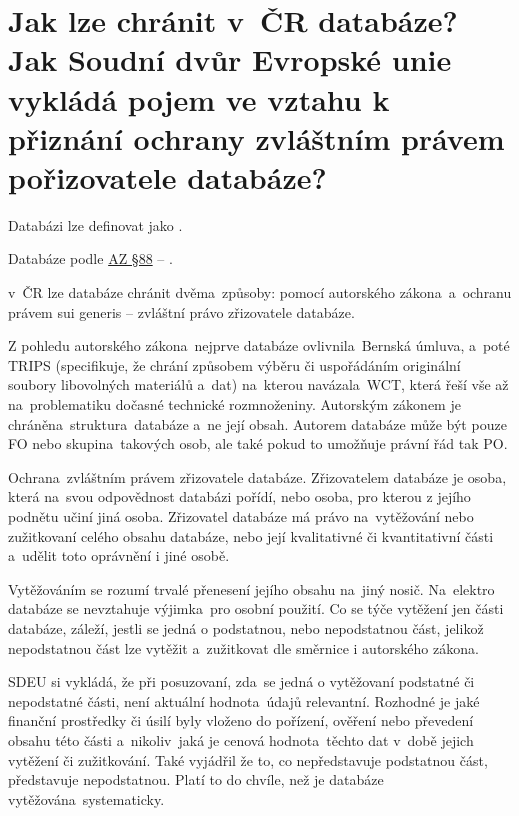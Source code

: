 \section{Jak lze chránit v~ČR databáze? Jak Soudní dvůr Evropské unie vykládá pojem  ve vztahu k přiznání ochrany zvláštním právem pořizovatele databáze?}

Databázi lze definovat jako .

Databáze podle \href{https://www.zakonyprolidi.cz/cs/2000-121#p88}{AZ §88} -- .

v~ČR lze databáze chránit dvěma~způsoby: pomocí autorského zákona~a~ochranu právem sui generis -- zvláštní právo zřizovatele databáze.

Z pohledu autorského zákona~nejprve databáze ovlivnila~Bernská úmluva, a~poté TRIPS (specifikuje, že chrání způsobem výběru či uspořádáním originální soubory libovolných materiálů a~dat) na~kterou navázala~WCT, která řeší vše až na~problematiku dočasné technické rozmnoženiny. Autorským zákonem je chráněna~struktura~databáze a~ne její obsah. Autorem databáze může být pouze FO nebo skupina~takových osob, ale také pokud to umožňuje právní řád tak PO\@.

Ochrana~zvláštním právem zřizovatele databáze. Zřizovatelem databáze je osoba, která na~svou odpovědnost databázi pořídí, nebo osoba, pro kterou z jejího podnětu učiní jiná osoba. Zřizovatel databáze má právo na~vytěžování nebo zužitkovaní celého obsahu databáze, nebo její kvalitativné či kvantitativní části a~udělit toto oprávnění i jiné osobě. 

Vytěžováním se rozumí trvalé přenesení jejího obsahu na~jiný nosič. Na~elektro databáze se nevztahuje výjimka~pro osobní použití. Co se týče vytěžení jen části databáze, záleží, jestli se jedná o podstatnou, nebo nepodstatnou část, jelikož nepodstatnou část lze vytěžit a~zužitkovat dle směrnice i autorského zákona.

SDEU si vykládá, že při posuzovaní, zda~se jedná o vytěžovaní podstatné či nepodstatné části, není aktuální hodnota~údajů relevantní. Rozhodné je jaké finanční prostředky či úsilí byly vloženo do pořízení, ověření nebo převedení obsahu této části a~nikoliv~jaká je cenová hodnota~těchto dat v~době jejich vytěžení či zužitkování. Také vyjádřil že to, co nepředstavuje podstatnou část, představuje nepodstatnou. Platí to do chvíle, než je databáze vytěžována~systematicky.


